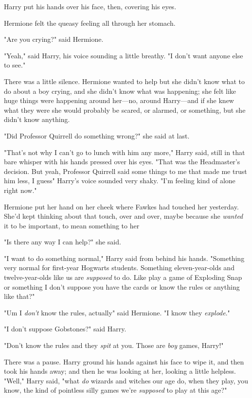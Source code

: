 Harry put his hands over his face, then, covering his eyes.

Hermione felt the queasy feeling all through her stomach.

"Are you crying?" said Hermione.

"Yeah," said Harry, his voice sounding a little breathy. "I don't want anyone
else to see."

There was a little silence. Hermione wanted to help but she didn't know what to
do about a boy crying, and she didn't know what was happening; she felt like
huge things were happening around her---no, around Harry---and if she knew what
they were she would probably be scared, or alarmed, or something, but she
didn't know anything.

"Did Professor Quirrell do something wrong?" she said at last.

"That's not why I can't go to lunch with him any more," Harry said, still in
that bare whisper with his hands pressed over his eyes. "That was the
Headmaster's decision. But yeah, Professor Quirrell said some things to me that
made me trust him less, I guess{\el}" Harry's voice sounded very shaky. "I'm
feeling kind of alone right now."

Hermione put her hand on her cheek where Fawkes had touched her yesterday.
She'd kept thinking about that touch, over and over, maybe because she
\emph{wanted} it to be important, to mean something to her{\el}

"Is there any way I can help?" she said.

"I want to do something normal," Harry said from behind his hands. "Something
very normal for first-year Hogwarts students. Something eleven-year-olds and
twelve-year-olds like us are \emph{supposed} to do. Like play a game of
Exploding Snap or something{\el} I don't suppose you have the cards or know
the rules or anything like that?"

"Um{\el} I \emph{don't} know the rules, actually{\el}" said Hermione. "I
know they \emph{explode}."

"I don't suppose Gobstones?" said Harry.

"Don't know the rules and they \emph{spit} at you. Those are \emph{boy} games,
Harry!"

There was a pause. Harry ground his hands against his face to wipe it, and then
took his hands away; and then he was looking at her, looking a little helpless.
"Well," Harry said, "what \emph{do} wizards and witches our age do, when they
play, you know, the kind of pointless silly games we're \emph{supposed} to play
at this age?"

